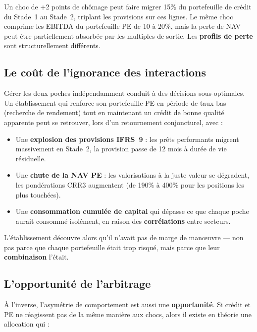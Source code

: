 \documentclass[12pt,a4paper]{article}
\begin{document}
\begin{keypoint}
Un choc de +2 points de chômage peut faire migrer 15\% du portefeuille de crédit du Stade~1 au Stade~2, triplant les provisions sur ces lignes. Le même choc comprime les EBITDA du portefeuille PE de 10 à 20\%, mais la perte de NAV peut être partiellement absorbée par les multiples de sortie. Les \textbf{profils de perte} sont structurellement différents.
\end{keypoint}

\subsection{Le coût de l'ignorance des interactions}

Gérer les deux poches indépendamment conduit à des décisions sous-optimales. Un établissement qui renforce son portefeuille PE en période de taux bas (recherche de rendement) tout en maintenant un crédit de bonne qualité apparente peut se retrouver, lors d'un retournement conjoncturel, avec :

\begin{itemize}
  \item Une \textbf{explosion des provisions IFRS~9} : les prêts performants migrent massivement en Stade~2, la provision passe de 12 mois à durée de vie résiduelle.
  \item Une \textbf{chute de la NAV PE} : les valorisations à la juste valeur se dégradent, les pondérations CRR3 augmentent (de 190\% à 400\% pour les positions les plus touchées).
  \item Une \textbf{consommation cumulée de capital} qui dépasse ce que chaque poche aurait consommé isolément, en raison des \textbf{corrélations} entre secteurs.
\end{itemize}

L'établissement découvre alors qu'il n'avait pas de marge de man\oe uvre --- non pas parce que chaque portefeuille était trop risqué, mais parce que leur \textbf{combinaison} l'était.

\subsection{L'opportunité de l'arbitrage}

À l'inverse, l'asymétrie de comportement est aussi une \textbf{opportunité}. Si crédit et PE ne réagissent pas de la même manière aux chocs, alors il existe en théorie une allocation qui :
\end{document}
